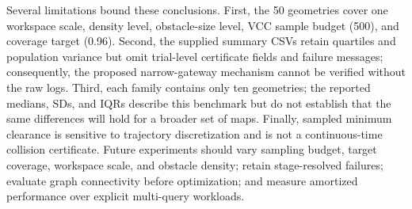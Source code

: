 Several limitations bound these conclusions. First, the 50 geometries cover one
workspace scale, density level, obstacle-size level, VCC sample budget (500),
and coverage target (0.96). Second, the supplied summary CSVs retain quartiles
and population variance but omit trial-level certificate fields and failure
messages; consequently, the proposed narrow-gateway mechanism cannot be
verified without the raw logs. Third, each family contains only ten geometries;
the reported medians, SDs, and IQRs describe this benchmark but do not establish
that the same differences will hold for a broader set of maps. Finally, sampled
minimum clearance is sensitive
to trajectory discretization and is not a continuous-time collision
certificate. Future experiments should vary sampling budget, target coverage,
workspace scale, and obstacle density; retain stage-resolved failures; evaluate
graph connectivity before optimization; and measure amortized performance over
explicit multi-query workloads.
